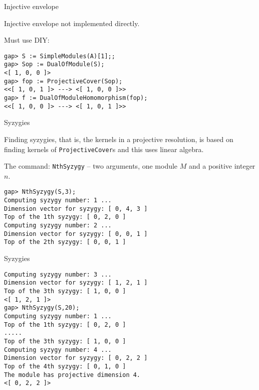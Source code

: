 \begin{frame}[fragile]{Injective envelope}

Injective envelope not implemented directly.\medskip 

Must use DIY:

\begin{verbatim}
gap> S := SimpleModules(A)[1];;
gap> Sop := DualOfModule(S);
<[ 1, 0, 0 ]>
gap> fop := ProjectiveCover(Sop);
<<[ 1, 0, 1 ]> ---> <[ 1, 0, 0 ]>>
gap> f := DualOfModuleHomomorphism(fop);
<<[ 1, 0, 0 ]> ---> <[ 1, 0, 1 ]>>
\end{verbatim}
\end{frame}

\begin{frame}[fragile]{Syzygies}

Finding syzygies, that is, the kernels in a projective resolution, is
based on finding kernels of \texttt{ProjectiveCover}s and this uses
linear algebra.\medskip  

The command:  \texttt{NthSyzygy} -- two arguments, one module $M$ and a
positive integer $n$.  
\begin{verbatim}
gap> NthSyzygy(S,3);
Computing syzygy number: 1 ...
Dimension vector for syzygy: [ 0, 4, 3 ]
Top of the 1th syzygy: [ 0, 2, 0 ]
Computing syzygy number: 2 ...
Dimension vector for syzygy: [ 0, 0, 1 ]
Top of the 2th syzygy: [ 0, 0, 1 ]
\end{verbatim}
\end{frame}

\begin{frame}[fragile]{Syzygies}

\begin{verbatim}
Computing syzygy number: 3 ...
Dimension vector for syzygy: [ 1, 2, 1 ]
Top of the 3th syzygy: [ 1, 0, 0 ]
<[ 1, 2, 1 ]>
gap> NthSyzygy(S,20);
Computing syzygy number: 1 ...
Top of the 1th syzygy: [ 0, 2, 0 ]
.....
Top of the 3th syzygy: [ 1, 0, 0 ]
Computing syzygy number: 4 ...
Dimension vector for syzygy: [ 0, 2, 2 ]
Top of the 4th syzygy: [ 0, 1, 0 ]
The module has projective dimension 4.
<[ 0, 2, 2 ]>
\end{verbatim}
\end{frame}

